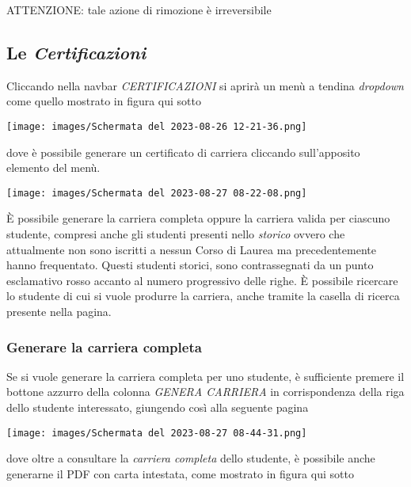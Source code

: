 \documentclass{article}
\newcommand{\alert}[0]{\textcolor{red}{\faExclamationCircle}}
\begin{document}
    \alert ATTENZIONE: tale azione di rimozione è irreversibile

    \pagebreak

    \subsection{Le \textit{Certificazioni}}

    Cliccando nella navbar \textit{CERTIFICAZIONI} si aprirà un menù a tendina \textit{dropdown} come quello mostrato in figura qui sotto
    \begin{center}
        \texttt{[image: images/Schermata del 2023-08-26 12-21-36.png]}
    \end{center}
    dove è possibile generare un certificato di carriera cliccando sull'apposito elemento del menù.

    \begin{center}
        \texttt{[image: images/Schermata del 2023-08-27 08-22-08.png]}
    \end{center}

    È possibile generare la carriera completa oppure la carriera valida per ciascuno studente, compresi anche gli studenti presenti nello \textit{storico} ovvero che attualmente non sono iscritti a nessun Corso di Laurea ma precedentemente hanno frequentato. Questi studenti storici, sono contrassegnati da un punto esclamativo rosso accanto al numero progressivo delle righe.
    È possibile ricercare lo studente di cui si vuole produrre la carriera, anche tramite la casella di ricerca presente nella pagina.

    \pagebreak

    \subsubsection{Generare la carriera completa}
    Se si vuole generare la carriera completa per uno studente, è sufficiente premere il bottone azzurro della colonna \textit{GENERA CARRIERA} in corrispondenza della riga dello studente interessato, giungendo così alla seguente pagina

    \begin{center}
        \texttt{[image: images/Schermata del 2023-08-27 08-44-31.png]}
    \end{center}

    dove oltre a consultare la \textit{carriera completa} dello studente, è possibile anche generarne il PDF con carta intestata, come mostrato in figura qui sotto
\end{document}
